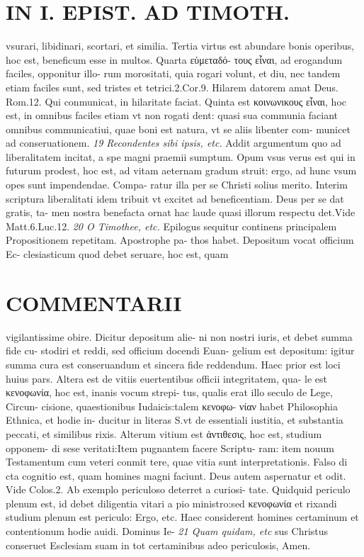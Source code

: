 \documentclass{article}
\begin{document}
\begin{pages}
\section*{IN I. EPIST. AD TIMOTH. }
\marginpar{[ p.169 ]}\pstart vsurari, libidinari, scortari, et similia. Tertia virtus est abundare bonis operibus, hoc est, beneficum esse in multos. Quarta εὐμεταδό- τους εἶναι, ad erogandum faciles, opponitur illo- rum morositati, quia rogari volunt, et diu, nec tandem etiam faciles sunt, sed tristes et tetrici.2.Cor.9. Hilarem datorem amat Deus. Rom.12. Qui conmunicat, in hilaritate faciat. Quinta est κοινωνικους εἶναι, hoc est, in omnibus faciles etiam vt non rogati dent: quasi sua communia faciant omnibus communicatiui, quae boni est natura, vt se aliis libenter com- municet ad conseruationem.  \pend
\textit{19 Recondentes sibi ipsis, etc. }\pstart Addit argumentum quo ad liberalitatem incitat, a spe magni praemii sumptum. Opum vsus verus est qui in futurum prodest, hoc est, ad vitam aeternam gradum struit: ergo, ad hunc vsum opes sunt impendendae. Compa- ratur illa per se Christi solius merito. Interim scriptura liberalitati idem tribuit vt excitet ad beneficentiam. Deus per se dat gratis, ta- men nostra benefacta ornat hac laude quasi illorum respectu det.Vide Matt.6.Luc.12.  \pend
\textit{20 O Timothee, etc. }\pstart Epilogus sequitur continens principalem Propositionem repetitam. Apostrophe pa- thos habet. Depositum vocat officium Ec- clesiasticum quod debet seruare, hoc est, quam  \pend
\marginpar{[ p.170 ]}
\section*{COMMENTARII }\pstart vigilantissime obire. Dicitur depositum alie- ni non nostri iuris, et debet summa fide cu- stodiri et reddi, sed officium docendi Euan- gelium est depositum: igitur summa cura est conseruandum et sincera fide reddendum. Haec prior est loci huius pars. Altera est de vitiis euertentibus officii integritatem, qua- le est κενοφωνία, hoc est, inanis vocum strepi- tus, qualis erat illo seculo de Lege, Circun- cisione, quaestionibus Iudaicis:talem κενοφω- νίαν habet Philosophia Ethnica, et hodie in- ducitur in literas S.vt de essentiali iustitia, et substantia peccati, et similibus rixis. Alterum vitium est ἀντιθεσις, hoc est, studium opponem- di sese veritati:Item pugnantem facere Scriptu- ram: item nouum Testamentum cum veteri conmit tere, quae vitia sunt interpretationis. Falso di cta cognitio est, quam homines magni faciunt. Deus autem aspernatur et odit. Vide Colos.2. Ab exemplo periculoso deterret a curiosi- tate. Quidquid periculo plenum est, id debet diligentia vitari a pio ministro:sed κενοφωνία et rixandi studium plenum est periculo: Ergo, etc. Haec considerent homines certaminum et contentionum hodie auidi. Dominus Ie-  \pend
\textit{21 Quam quidam, etc }\pstart sus Christus conseruet Esclesiam suam in tot certaminibus adeo periculosis, Amen.  \pend
\end{pages}
\end{document}
